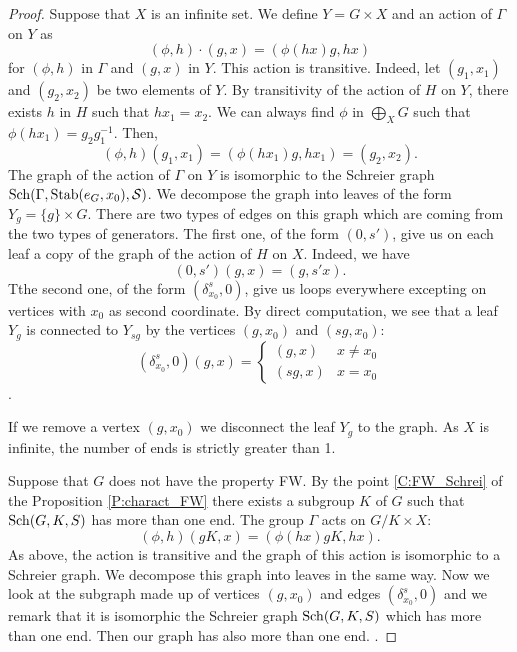 \begin{lem}
\begin{proof}
Suppose that $X$ is an infinite set. We define $Y = G \times X$ and an action of $\Gamma$ on $Y$ as
\begin{equation*}
(\phi,h) \cdot (g,x) = (\phi(hx)g, hx)
\end{equation*}
for $(\phi,h)$ in $\Gamma$ and $(g,x)$ in $Y$. This action is transitive. Indeed, let $(g_1,x_1)$ and $(g_2,x_2)$ be two elements of $Y$. By transitivity of the action of $H$ on $Y$, there exists $h$ in $H$ such that $hx_1 = x_2$. We can always find $\phi$ in $\bigoplus_X G$ such that $\phi(hx_1) = g_2g_1^{-1}$. Then, 
\begin{equation*}
(\phi,h) (g_1,x_1) = (\phi(h x_1) g, h x_1) = (g_2,x_2).
\end{equation*}
The graph of the action of $\Gamma$ on $Y$ is isomorphic to the Schreier graph $\operatorname{Sch}(\Gamma, \operatorname{Stab}(e_G,x_0), \mathcal{S})$. We decompose the graph into leaves of the form $Y_g = \{ g \} \times G$. There are two types of edges on this graph which are coming from the two types of generators. The first one, of the form $(0,s')$, give us on each leaf a copy of the graph of the action of $H$ on $X$. Indeed, we have
\begin{equation*}
(0,s')(g,x) = (g, s'x).
\end{equation*}
Tthe second one, of the form $(\delta_{x_0}^s,0)$, give us loops everywhere excepting on vertices with $x_0$ as second coordinate. By direct computation, we see that a leaf $Y_g$ is connected to $Y_{sg}$ by the vertices $(g,x_0)$ and $(sg,x_0)$: 
\begin{equation*}
(\delta_{x_0}^s,0)(g,x) = 
\begin{cases}
(g,x) & x \neq x_0 \\
(sg, x) & x = x_0
\end{cases}
\end{equation*}
.

If we remove a vertex $(g,x_0)$ we disconnect the leaf $Y_g$ to the graph. As $X$ is infinite, the number of ends is strictly greater than 1.

Suppose that $G$ does not have the property FW. By the point \ref{C:FW_Schrei} of the Proposition \ref{P:charact_FW} there exists a subgroup $K$ of $G$ such that $\operatorname{Sch}(G,K,S)$ has more than one end. The group $\Gamma$ acts on $G/K \times X$:  
\begin{equation*}
(\phi,h)(gK,x) = (\phi(hx) gK, hx).
\end{equation*}
As above, the action is transitive and the graph of this action is isomorphic to a Schreier graph. We decompose this graph into leaves in the same way. Now we look at the subgraph made up of vertices $(g,x_0)$ and edges $(\delta_{x_0}^s,0)$ and we remark that it is isomorphic the Schreier graph $\operatorname{Sch}(G,K,S)$ which has more than one end. Then our graph has also more than one end.
.


\end{proof}
\end{lem}
